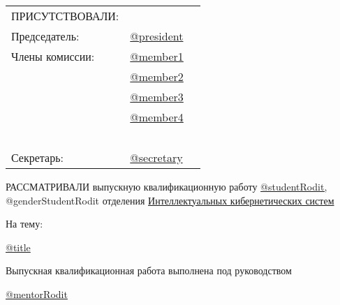 \documentclass[a4paper,12pt]{article} %
\begin{document}
\begin{center} 		
	\begin{tabular}{lll}
		\vspace{0.2cm}
		ПРИСУТСТВОВАЛИ:\\
		\vspace{0.4cm}
		Председатель:  \hspace{2cm} 	& \underline{@president}  \\
		Члены комиссии:\hspace{2cm} 	& \underline{@member1}  \\
					   \hspace{2cm}  	& \underline{@member2}  \\
					   \hspace{2cm}		& \underline{@member3}  \\
					   \hspace{2cm}		& \underline{@member4}  \\
		\ \\ %
		\vspace{0.4cm}			
		Секретарь:     \hspace{2cm}		& \underline{@secretary}  \\	    
	\end{tabular}
\end{center}
	\vspace{-0.3cm}
	
	\hspace{1cm}РАССМАТРИВАЛИ выпускную квалификационную работу 
	\underline{@studentRodit,}\\
	
	\vspace{-0.4cm}
	\hspace{1cm}@genderStudentRodit отделения \underline{Интеллектуальных кибернетических систем}

    \vspace{0.2cm}
	\hspace{1cm}На тему: 

	\hspace{1cm}\underline{@title}
	
    \vspace{0.2cm}
	\hspace{1cm}Выпускная квалификационная работа выполнена под руководством
	
	
    \hspace{1cm}\underline{@mentorRodit}\\
\end{document}
